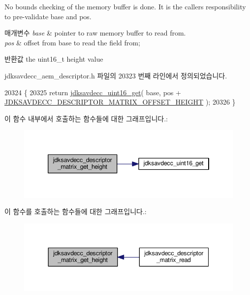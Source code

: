 No bounds checking of the memory buffer is done. It is the caller\textquotesingle{}s responsibility to pre-\/validate base and pos.


\begin{DoxyParams}{매개변수}
{\em base} & pointer to raw memory buffer to read from. \\
\hline
{\em pos} & offset from base to read the field from; \\
\hline
\end{DoxyParams}
\begin{DoxyReturn}{반환값}
the uint16\+\_\+t height value 
\end{DoxyReturn}


jdksavdecc\+\_\+aem\+\_\+descriptor.\+h 파일의 20323 번째 라인에서 정의되었습니다.


\begin{DoxyCode}
20324 \{
20325     \textcolor{keywordflow}{return} \hyperlink{group__endian_ga3fbbbc20be954aa61e039872965b0dc9}{jdksavdecc\_uint16\_get}( base, pos + 
      \hyperlink{group__descriptor__matrix_ga07d49694a8b142abb1019ea6db0f88e5}{JDKSAVDECC\_DESCRIPTOR\_MATRIX\_OFFSET\_HEIGHT} );
20326 \}
\end{DoxyCode}


이 함수 내부에서 호출하는 함수들에 대한 그래프입니다.\+:
\nopagebreak
\begin{figure}[H]
\begin{center}
\leavevmode
\includegraphics[width=346pt]{group__descriptor__matrix_gab382908e84a397fe7857ab9a89db564f_cgraph}
\end{center}
\end{figure}




이 함수를 호출하는 함수들에 대한 그래프입니다.\+:
\nopagebreak
\begin{figure}[H]
\begin{center}
\leavevmode
\includegraphics[width=344pt]{group__descriptor__matrix_gab382908e84a397fe7857ab9a89db564f_icgraph}
\end{center}
\end{figure}


